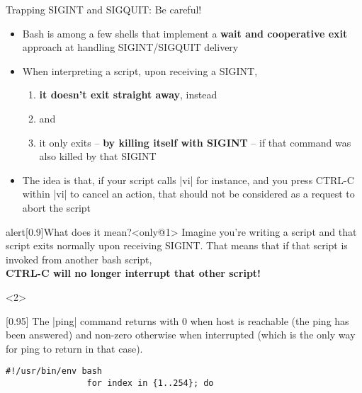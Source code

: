 \begin{frame}[fragile]{Trapping SIGINT and SIGQUIT: Be careful!}
    \vspace{-1mm}
    \begin{overlayarea}{\textwidth}{0.7\textheight}
        \begin{itemize}
            \item Bash is among a few shells that implement a \textbf{wait and cooperative exit} approach at handling SIGINT/SIGQUIT delivery
            \item When interpreting a script, upon receiving a SIGINT,
            \begin{enumerate}
                \item \textbf{it doesn't exit straight away}, instead
                \item {} and
                \item \alert{it only exits -- \textbf{by killing itself with SIGINT} -- if that command was also killed by that SIGINT}
            \end{enumerate}
            \item<only@1> The idea is that, if your script calls \bash|vi| for instance, and you press CTRL-C within \bash|vi| to cancel an action, that should not be considered as a request to abort the script
        \end{itemize}
        \begin{varblock}{alert}[0.9\textwidth]{What does it mean?}<only@1>
            Imagine you're writing a script and that script exits normally upon receiving SIGINT.
            That means that if that script is invoked from another bash script, \\\alert{\textbf{CTRL-C will no longer interrupt that other script!}}
        \end{varblock}
        \begin{onlyenv}<2>
            \begin{varblock}{}[0.95\textwidth]{}
                \small The \bash|ping| command returns with 0 when host is reachable (the ping has been answered) and non-zero otherwise when interrupted (which is the only way for ping to return in that case).
            \end{varblock}
            \begin{lstlisting}[style=MyBash, aboveskip=0mm, belowskip=-6mm]
                #!/usr/bin/env bash
                for index in {1..254}; do

\end{lstlisting}
\end{onlyenv}
\end{overlayarea}
\end{frame}
